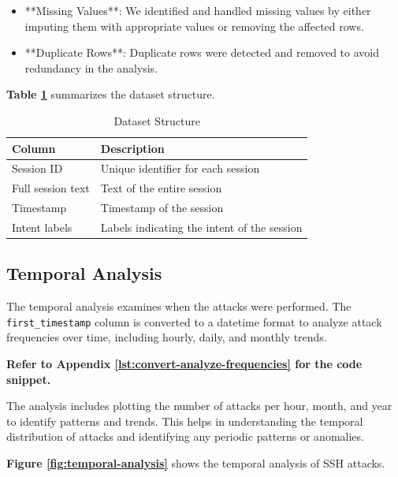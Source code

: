         \begin{itemize}
            \item **Missing Values**: We identified and handled missing values by either imputing them with appropriate values or removing the affected rows.
            \item **Duplicate Rows**: Duplicate rows were detected and removed to avoid redundancy in the analysis.
        \end{itemize}

        \textbf{Table \ref{tab:dataset-structure}} summarizes the dataset structure.

        \begin{table}[h]
            \centering
            \caption{Dataset Structure}
            \label{tab:dataset-structure}
            \begin{tabular}{|l|l|}
                \hline
                \textbf{Column} & \textbf{Description} \\ \hline
                Session ID & Unique identifier for each session \\ \hline
                Full session text & Text of the entire session \\ \hline
                Timestamp & Timestamp of the session \\ \hline
                Intent labels & Labels indicating the intent of the session \\ \hline
            \end{tabular}
        \end{table}

    \subsection{Temporal Analysis}
    
        The temporal analysis examines when the attacks were performed. The \texttt{first\_timestamp} column is converted to a datetime format to analyze attack frequencies over time, including hourly, daily, and monthly trends.
            
        \textbf{Refer to Appendix \ref{lst:convert-analyze-frequencies} for the code snippet.}

        The analysis includes plotting the number of attacks per hour, month, and year to identify patterns and trends. This helps in understanding the temporal distribution of attacks and identifying any periodic patterns or anomalies.

        \textbf{Figure \ref{fig:temporal-analysis}} shows the temporal analysis of SSH attacks.

